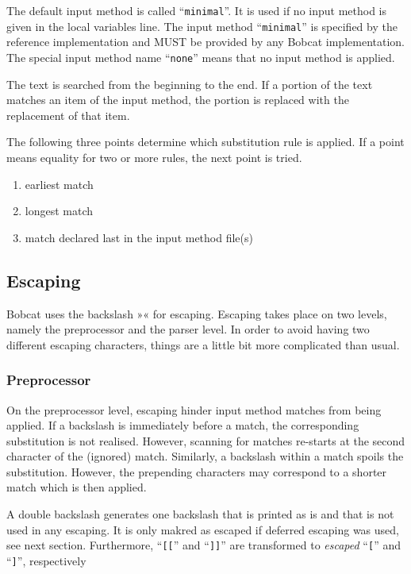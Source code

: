 \documentclass[12pt,openany]{book}
\begin{document}
The default input method is called ``\verb|minimal|''.  It is used if no input
method is given in the local variables line.  The input method
``\verb|minimal|'' is specified by the reference implementation and MUST be
provided by any Bobcat implementation.  The special input method name
``\verb|none|'' means that no input method is applied.

The text is searched from the beginning to the end.  If a portion of the text
matches an item of the input method, the portion is replaced with the
replacement of that item.

The following three points determine which substitution rule is applied.  If a
point means equality for two or more rules, the next point is tried.

\begin{enumerate}
\item earliest match
\item longest match
\item match declared last in the input method file(s)
\end{enumerate}

\subsection{Escaping}

Bobcat uses the backslash »« for escaping.  Escaping takes place on two
levels, namely the preprocessor and the parser level.  In order to avoid having
two different escaping characters, things are a little bit more complicated
than usual.

\subsubsection*{Preprocessor}

On the preprocessor level, escaping hinder input method matches from being
applied.  If a backslash is immediately before a match, the corresponding
substitution is not realised.  However, scanning for matches re-starts at the
second character of the (ignored) match.  Similarly, a backslash within a match
spoils the substitution.  However, the prepending characters may correspond to
a shorter match which is then applied.

A double backslash generates one backslash that is printed as is and that is
not used in any escaping.  It is only makred as escaped if deferred escaping
was used, see next section.  Furthermore, ``\verb|[[|'' and ``\verb|]]|'' are
transformed to \emph{escaped} ``\verb|[|'' and ``\verb|]|'', respectively
\end{document}
